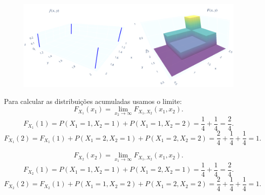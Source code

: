\begin{frame}
	
	\begin{figure}[!htb]
		\begin{center}
			\includegraphics[scale=0.25]{f0-F0.png}
		\end{center}
	\end{figure} \small
Para calcular as distribuições acumuladas usamos o limite:
\[
F_{X_1}(x_1) = \lim_{x_2 \to \infty} F_{X_1, X_2}(x_1, x_2).
\] 
\[
F_{X_1}(1) = P(X_1 = 1, X_2 = 1) + P(X_1 = 1, X_2 = 2) = \frac{1}{4} + \frac{1}{4} = \frac{2}{4}.
\]
\[
F_{X_1}(2) = F_{X_1}(1) + P(X_1 = 2, X_2 = 1) + P(X_1 = 2, X_2 = 2) = \frac{2}{4} + \frac{1}{4} + \frac{1}{4} = 1.
\]

\[
F_{X_2}(x_2) = \lim_{x_1 \to \infty} F_{X_1, X_2}(x_1, x_2).
\]
\[
F_{X_2}(1) = P(X_1 = 1, X_2 = 1) + P(X_1 = 2, X_2 = 1) = \frac{1}{4} + \frac{1}{4} = \frac{2}{4}.
\]
\[
F_{X_2}(2) = F_{X_2}(1) + P(X_1 = 1, X_2 = 2) + P(X_1 = 2, X_2 = 2) = \frac{2}{4} + \frac{1}{4} + \frac{1}{4} = 1.
\]
	
\end{frame}	


